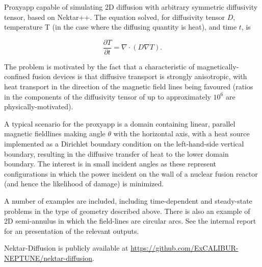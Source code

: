 Proxyapp capable of simulating 2D diffusion with arbitrary symmetric diffusivity tensor, based on Nektar++.  The
equation solved, for diffusivity tensor $D$, temperature T (in the case where the diffusing quantity is heat), and 
time $t$, is

\begin{equation}
\frac{\partial T}{\partial t} = \nabla \cdot \left ( D  \nabla T \right ). 
\end{equation}  

The problem is motivated by the fact that a characteristic of magnetically-confined fusion devices is that diffusive 
transport is strongly anisotropic, with heat transport in the direction of the magnetic field lines being favoured 
(ratios in the components of the diffusivity tensor of up to approximately $10^6$ are physically-motivated).

A typical scenario for the proxyapp is a domain containing linear, parallel magnetic fieldlines making 
angle $\theta$ with the horizontal axis, with a heat source implemented as a Dirichlet boundary condition on the 
left-hand-side vertical boundary, resulting in the diffusive transfer of heat to the lower domain boundary.  The 
interest is in small incident angles as these represent configurations in which the power incident on the wall of a 
nuclear fusion reactor (and hence the likelihood of damage) is minimized.

A number of examples are included, including time-dependent and steady-state problems in the type of geometry
 described above.  There is also an example of 2D semi-annulus in which the field-lines are circular arcs.  See the 
internal report \cite{y3re222} for an presentation of the relevant outputs.

Nektar-Diffusion is publicly available at \url{https://github.com/ExCALIBUR-NEPTUNE/nektar-diffusion}.
